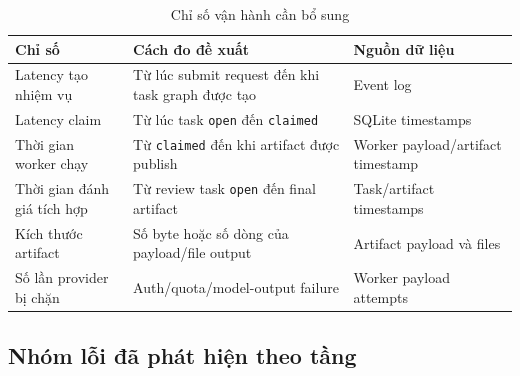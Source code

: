 \documentclass[12pt,a4paper]{article}
\begin{document}
\begin{table}[H]
\centering
\caption{Chỉ số vận hành cần bổ sung}
\begin{tabular}{p{}p{}p{}}
\toprule
\textbf{Chỉ số} & \textbf{Cách đo đề xuất} & \textbf{Nguồn dữ liệu} \\
\midrule
Latency tạo nhiệm vụ & Từ lúc submit request đến khi task graph được tạo & Event log \\
Latency claim & Từ lúc task \texttt{open} đến \texttt{claimed} & SQLite timestamps \\
Thời gian worker chạy & Từ \texttt{claimed} đến khi artifact được publish & Worker payload/artifact timestamp \\
Thời gian đánh giá tích hợp & Từ review task \texttt{open} đến final artifact & Task/artifact timestamps \\
Kích thước artifact & Số byte hoặc số dòng của payload/file output & Artifact payload và files \\
Số lần provider bị chặn & Auth/quota/model-output failure & Worker payload attempts \\
\bottomrule
\end{tabular}
\end{table}

\subsection{Nhóm lỗi đã phát hiện theo tầng}
\end{document}
